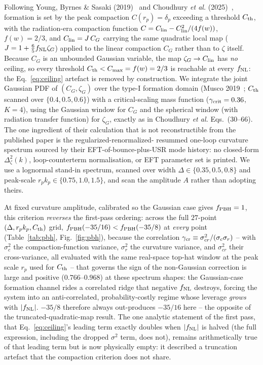 \documentclass[aps,prd,twocolumn,superscriptaddress,nofootinbib,longbibliography]{revtex4-2}
\newcommand{\fnl}{f_{\rm NL}}
\newcommand{\fpbh}{f_{\rm PBH}}
\begin{document}
Following Young, Byrnes \& Sasaki (2019)~\cite{YoungByrnesSasaki2019} and Choudhury
\textit{et al.} (2025)~\cite{Choudhury2025}, formation is set by the peak
compaction $C(r_p) = \delta_p$ exceeding a threshold $C_{\rm th}$, with the
radiation-era compaction function $C = C_{\rm lin} - C_{\rm lin}^2/(4f(w))$,
$f(w) = 2/3$, and $C_{\rm lin} = J\,C_G$ carrying the same quadratic local map
($J = 1 + \tfrac{6}{5}\fnl\zeta_G$) applied to the linear compaction $C_G$
rather than to $\zeta$ itself. Because $C_G$ is an unbounded Gaussian variable,
the map $\zeta_G \to C_{\rm lin}$ has \emph{no} ceiling, so every threshold
$C_{\rm th} < C_{\max} = f(w) = 2/3$ is reachable at every $\fnl$: the
Eq.~\eqref{eq:ceiling} artefact is removed by construction. We integrate the
joint Gaussian PDF of $(C_G,\zeta_G)$ over the type-I formation domain (Musco
2019~\cite{Musco2019}; $C_{\rm th}$ scanned over $\{0.4,0.5,0.6\}$) with a
critical-scaling mass function ($\gamma_{\rm crit} = 0.36$, $K = 4$), using the
Gaussian window for $C_G$ and the spherical window (with radiation transfer
function) for $\zeta_G$, exactly as in Choudhury \textit{et al.}
Eqs.~(30--66). The one ingredient of their calculation that is not
reconstructible from the published paper is the regularized-renormalized-
resummed one-loop curvature spectrum sourced by their EFT-of-bounce-plus-USR
mode history: no closed-form $\Delta_\zeta^2(k)$, loop-counterterm
normalisation, or EFT parameter set is printed. We use a lognormal stand-in
spectrum, scanned over width $\Delta\in\{0.35,0.5,0.8\}$ and peak-scale
$r_pk_p\in\{0.75,1.0,1.5\}$, and scan the amplitude $A$ rather than adopting
theirs.

At fixed curvature amplitude, calibrated so the Gaussian case gives
$\fpbh = 1$, this criterion \emph{reverses} the first-pass ordering: across the
full $27$-point $(\Delta, r_pk_p, C_{\rm th})$ grid,
$\fpbh(-35/16) < \fpbh(-35/8)$ at \emph{every} point (Table~\ref{tab:pbh},
Fig.~\ref{fig:pbh}), because the correlation $\gamma_{\rm cr} \equiv
\sigma_{cr}^2/(\sigma_c\sigma_r)$ -- with $\sigma_c^2$ the compaction-function
variance, $\sigma_r^2$ the curvature variance, and $\sigma_{cr}^2$ their
cross-variance, all evaluated with the same real-space top-hat window at the
peak scale $r_p$ used for $C_{\rm th}$ -- that governs the sign of the
non-Gaussian correction is large and positive ($0.766$--$0.968$) at these spectrum shapes:
the Gaussian-case formation channel rides a correlated ridge that negative
$\fnl$ destroys, forcing the system into an anti-correlated, probability-costly
regime whose leverage \emph{grows} with $|\fnl|$. $-35/8$ therefore always
out-produces $-35/16$ here -- the opposite of the truncated-quadratic-map
result. The one analytic statement of the first pass, that
Eq.~\eqref{eq:ceiling}'s leading term exactly doubles when $|\fnl|$ is
halved (the full expression, including the dropped $\sigma^2$ term, does not),
remains arithmetically true of that leading term but is now physically empty: it described a
truncation artefact that the compaction criterion does not share.
\end{document}

